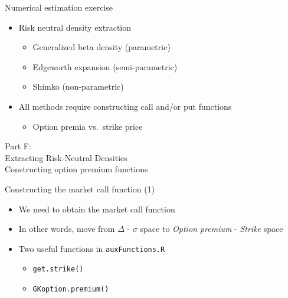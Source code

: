 \begin{frame}{Numerical estimation exercise}

\begin{itemize}
\tightlist
\item
  Risk neutral density extraction

  \begin{itemize}
  \tightlist
  \item
    Generalized beta density (parametric)
  \item
    Edgeworth expansion (semi-parametric)
  \item
    Shimko (non-parametric)
  \end{itemize}
\item
  All methods require constructing call and/or put functions

  \begin{itemize}
  \tightlist
  \item
    Option premia vs.~strike price
  \end{itemize}
\end{itemize}

\end{frame}

\begin{frame}{}

\color{blue} \LARGE{Part F:}\\
\LARGE{Extracting Risk-Neutral Densities}\\
\Large{Constructing option premium functions}

\end{frame}

\begin{frame}[fragile]{Constructing the market call function (1)}

\begin{itemize}
\tightlist
\item
  We need to obtain the market call function
\item
  In other words, move from \(\Delta\) - \(\sigma\) space to
  \emph{Option premium} - \emph{Strike} space
\item
  Two useful functions in \texttt{auxFunctions.R}

  \begin{itemize}
  \tightlist
  \item
    \texttt{get.strike()}
  \item
    \texttt{GKoption.premium()}
  \end{itemize}
\end{itemize}

\end{frame}

